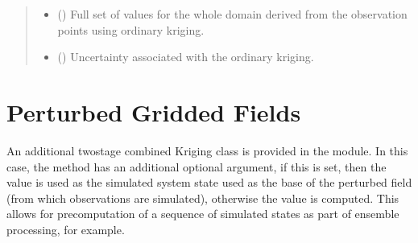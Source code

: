\documentclass[letterpaper,10pt,english]{sphinxmanual}
\begin{document}
\begin{fulllineitems}
\begin{quote}
\begin{description}
\sphinxAtStartPar
\begin{itemize}
\item {}
\sphinxAtStartPar
{} () \textendash{} Full set of values for the whole domain derived from the observation
points using ordinary kriging.

\item {}
\sphinxAtStartPar
{} () \textendash{} Uncertainty associated with the ordinary kriging.

\end{itemize}


\end{description}\end{quote}

\end{fulllineitems}



\section{Perturbed Gridded Fields}
\label{\detokenize{kriging:perturbed-gridded-fields}}
\sphinxAtStartPar
An additional two\sphinxhyphen{}stage combined Kriging class is provided in the  module. In this case,
the  method has an additional optional  argument, if this is set, then the
value is used as the simulated system state used as the base of the perturbed field (from which
observations are simulated), otherwise the value is computed. This allows for pre\sphinxhyphen{}computation of a
sequence of simulated states as part of ensemble processing, for example.
\end{document}
